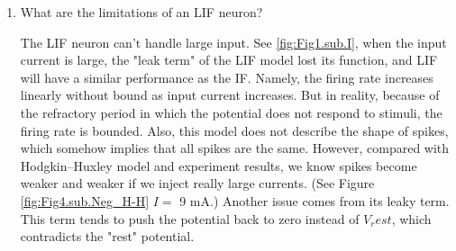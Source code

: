 \documentclass[11pt]{article}
\begin{document}
\begin{enumerate}
		\item What are the limitations of an LIF neuron?
			
		The LIF neuron can't handle large input. See \ref{fig:Fig1.sub.I}, when the input current is large, the "leak term" of the LIF model lost its function, and LIF will have a similar performance as the IF. Namely, the firing rate increases linearly without bound as input current increases. But in reality, because of the refractory period in which the potential does not respond to stimuli, the firing rate is bounded. Also, this model does not describe the shape of spikes, which somehow implies that all spikes are the same. However, compared with Hodgkin–Huxley model and experiment results, we know spikes become weaker and weaker if we inject really large currents. (See Figure \ref{fig:Fig4.sub.Neg_H-H} $I =$ 9 mA.) Another issue comes from its leaky term. This term tends to push the potential back to zero instead of $V_rest$, which contradicts the "rest" potential.	
			
	\end{enumerate}
	
\end{document}
